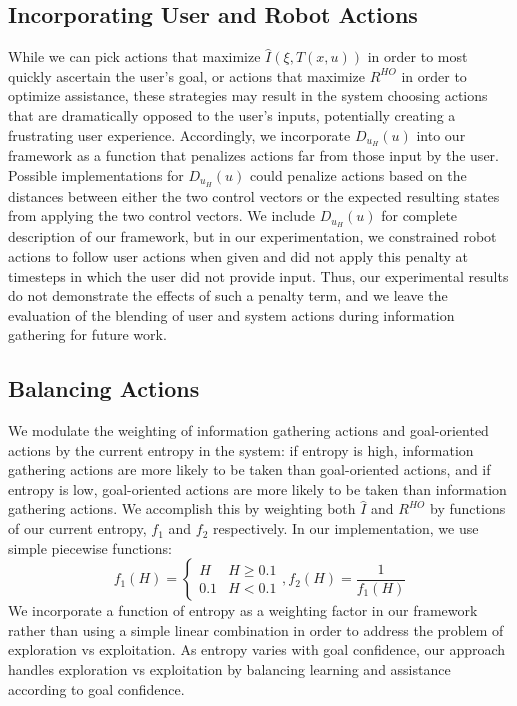\documentclass[conference]{IEEEtran}
\begin{document}
\subsection{Incorporating User and Robot Actions}
While we can pick actions that maximize $\hat{I}(\xi, T(x,u))$ in order to most quickly ascertain the user's goal, or actions that maximize $R^{HO}$ in order to optimize assistance, these strategies may result in the system choosing actions that are dramatically opposed to the user's inputs, potentially creating a frustrating user experience. Accordingly, we incorporate $D_{u_H}(u)$ into our framework as a function that penalizes actions far from those input by the user. Possible implementations for $D_{u_H}(u)$ could penalize actions based on the distances between either the two control vectors or the expected resulting states from applying the two control vectors. We include $D_{u_H}(u)$ for complete description of our framework, but in our experimentation, we constrained robot actions to follow user actions when given and did not apply this penalty at timesteps in which the user did not provide input. Thus, our experimental results do not demonstrate the effects of such a penalty term, and we leave the evaluation of the blending of user and system actions during information gathering for future work.

\subsection{Balancing Actions}

We modulate the weighting of information gathering actions and goal-oriented actions by the current entropy in the system: if entropy is high, information gathering actions are more likely to be taken than goal-oriented actions, and if entropy is low, goal-oriented actions are more likely to be taken than information gathering actions. We accomplish this by weighting both $\hat{I}$ and $R^{HO}$ by functions of our current entropy, $f_1$ and $f_2$ respectively. In our implementation, we use simple piecewise functions:
\[
f_1(H) =
\begin{cases}
H & H\geq 0.1 \\
0.1 & H < 0.1
\end{cases}
,f_2(H) = \frac{1}{f_1(H)}
\]
We incorporate a function of entropy as a weighting factor in our framework rather than using a simple linear combination in order to address the problem of exploration vs exploitation. As entropy varies with goal confidence, our approach handles exploration vs exploitation by balancing learning and assistance according to goal confidence.
\end{document}
